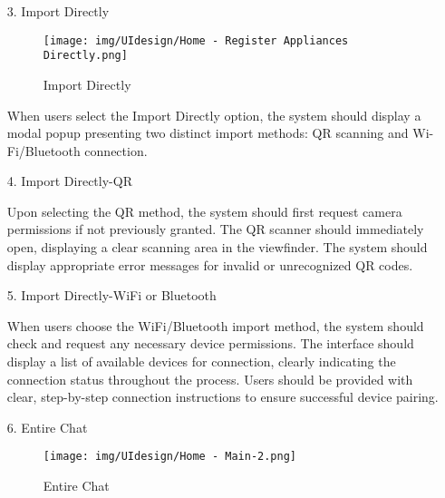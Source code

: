 \documentclass[conference]{IEEEtran}
\begin{document}
\begin{enumerate}
\begin{itemize}
\begin{itemize}
\begin{enumerate}
\begin{enumerate}
    \item[3.] Import Directly
    \begin{figure}[h]
        {\centering
        \hspace{4cm}
        \begin{minipage}{0.4\columnwidth}
            \texttt{[image: img/UIdesign/Home - Register Appliances Directly.png]}
            \caption{Import Directly}
        \end{minipage}}
    \end{figure}
    
    When users select the Import Directly option, the system should display a modal popup presenting two distinct import methods: QR scanning and Wi-Fi/Bluetooth connection. \\ 
\end{enumerate}

\begin{enumerate}
    \item[4.] Import Directly-QR
    
    Upon selecting the QR method, the system should first request camera permissions if not previously granted. The QR scanner should immediately open, displaying a clear scanning area in the viewfinder. The system should display appropriate error messages for invalid or unrecognized QR codes. \\ 
\end{enumerate}

\begin{enumerate}
    \item[5.] Import Directly-WiFi or Bluetooth
    
    When users choose the WiFi/Bluetooth import method, the system should check and request any necessary device permissions. The interface should display a list of available devices for connection, clearly indicating the connection status throughout the process. Users should be provided with clear, step-by-step connection instructions to ensure successful device pairing.
\end{enumerate}

\clearpage

\begin{enumerate}
    \item[6.] Entire Chat
    \begin{figure}[h]
        {\centering
        \hspace{4cm}
        \begin{minipage}{0.4\columnwidth}
            \texttt{[image: img/UIdesign/Home - Main-2.png]}
            \caption{Entire Chat}
        \end{minipage}}
    \end{figure}
    

\end{enumerate}
\end{enumerate}
\end{itemize}
\end{itemize}
\end{enumerate}
\end{document}
